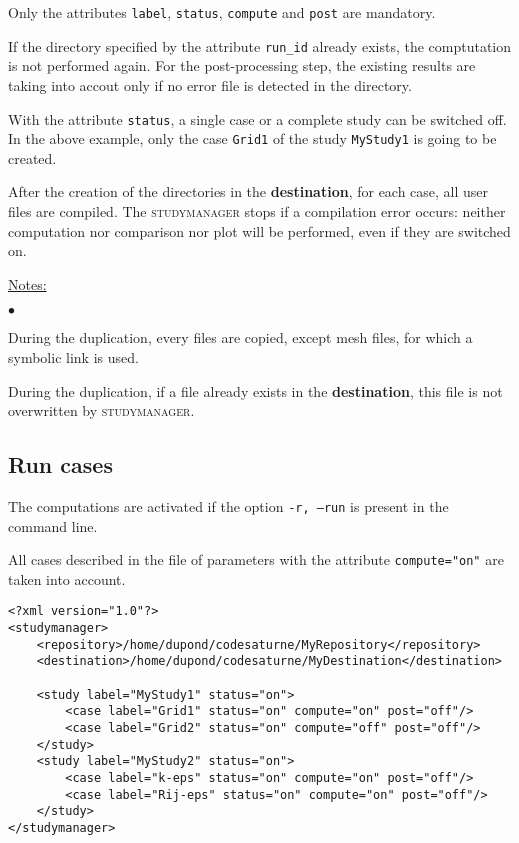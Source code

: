 \documentclass[a4paper,10pt,twoside]{csshortdoc}
\begin{document}
Only the attributes \texttt{label}, \texttt{status}, \texttt{compute}
and \texttt{post} are mandatory.

If the directory specified by the attribute \texttt{run\_id} already exists,
the comptutation is not performed again. For the post-processing step, the existing
results are taking into accout only if no error file is detected in the
directory.

With the attribute \texttt{status}, a single case or a complete study can be
switched off. In the above example, only the case \texttt{Grid1} of the study
\texttt{MyStudy1} is going to be created.

After the creation of the directories in the \textbf{destination}, for each
case, all user files are compiled. The \textsc{studymanager} stops if a compilation
error occurs: neither computation nor comparison nor plot will be performed,
even if they are switched on.

\underline{Notes:}

\begin{list}{$\bullet$}{}
\item During the duplication, every files are copied, except mesh files, for
which a symbolic link is used.
\item During the duplication, if a file already exists in the
\textbf{destination}, this file is not overwritten by \textsc{studymanager}.
\end{list}


\subsection{Run cases}\label{sec:run}

The computations are activated if the option \texttt{-r, --run} is present in
the command line.

All cases described in the file of parameters with the attribute
\texttt{compute="on"} are taken into account.

\small
\begin{verbatim}
<?xml version="1.0"?>
<studymanager>
    <repository>/home/dupond/codesaturne/MyRepository</repository>
    <destination>/home/dupond/codesaturne/MyDestination</destination>

    <study label="MyStudy1" status="on">
        <case label="Grid1" status="on" compute="on" post="off"/>
        <case label="Grid2" status="on" compute="off" post="off"/>
    </study>
    <study label="MyStudy2" status="on">
        <case label="k-eps" status="on" compute="on" post="off"/>
        <case label="Rij-eps" status="on" compute="on" post="off"/>
    </study>
</studymanager>
\end{verbatim}
\normalsize
\end{document}
